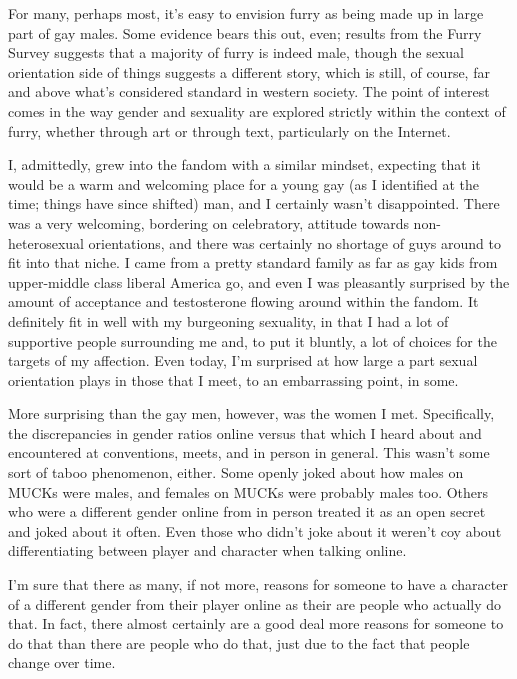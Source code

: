 
For many, perhaps most, it's easy to envision furry as being made up in large part of gay males. Some evidence bears this out, even; results from the Furry Survey suggests that a majority of furry is indeed male, though the sexual orientation side of things suggests a different story, which is still, of course, far and above what's considered standard in western society. The point of interest comes in the way gender and sexuality are explored strictly within the context of furry, whether through art or through text, particularly on the Internet.

I, admittedly, grew into the fandom with a similar mindset, expecting that it would be a warm and welcoming place for a young gay (as I identified at the time; things have since shifted) man, and I certainly wasn't disappointed. There was a very welcoming, bordering on celebratory, attitude towards non-heterosexual orientations, and there was certainly no shortage of guys around to fit into that niche. I came from a pretty standard family as far as gay kids from upper-middle class liberal America go, and even I was pleasantly surprised by the amount of acceptance and testosterone flowing around within the fandom. It definitely fit in well with my burgeoning sexuality, in that I had a lot of supportive people surrounding me and, to put it bluntly, a lot of choices for the targets of my affection. Even today, I'm surprised at how large a part sexual orientation plays in those that I meet, to an embarrassing point, in some.

More surprising than the gay men, however, was the women I met. Specifically, the discrepancies in gender ratios online versus that which I heard about and encountered at conventions, meets, and in person in general. This wasn't some sort of taboo phenomenon, either. Some openly joked about how males on MUCKs were males, and females on MUCKs were probably males too. Others who were a different gender online from in person treated it as an open secret and joked about it often. Even those who didn't joke about it weren't coy about differentiating between player and character when talking online.

I'm sure that there as many, if not more, reasons for someone to have a character of a different gender from their player online as their are people who actually do that. In fact, there almost certainly are a good deal more reasons for someone to do that than there are people who do that, just due to the fact that people change over time.

